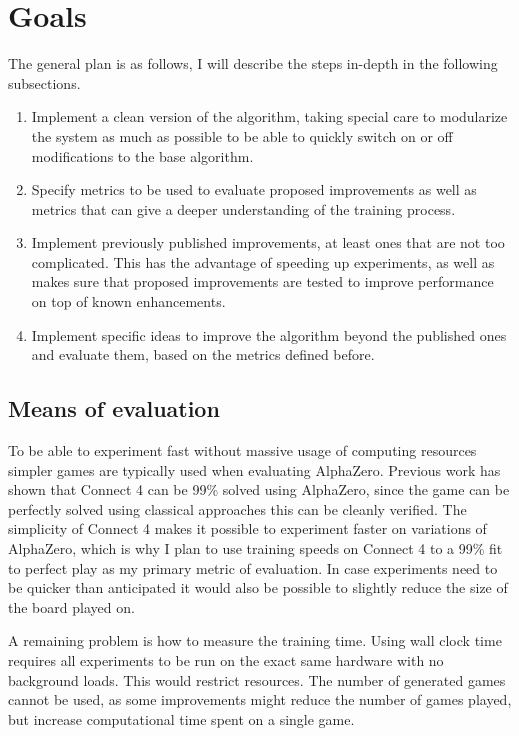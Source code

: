 \documentclass[12pt,onecolumn,oneside,titlepage]{article}
\begin{document}
\section{Goals}

The general plan is as follows, I will describe the steps in-depth in the following subsections.

\begin{enumerate}
 \item Implement a clean version of the algorithm, taking special care to modularize the system as much as possible to be able to quickly switch on or off modifications to the base algorithm.
 \item Specify metrics to be used to evaluate proposed improvements as well as metrics that can give a deeper understanding of the training process.
 \item Implement previously published improvements, at least ones that are not too complicated. This has the advantage of speeding up experiments, as well as makes sure that proposed improvements are tested to improve performance on top of known enhancements.
 \item Implement specific ideas to improve the algorithm beyond the published ones and evaluate them, based on the metrics defined before.
\end{enumerate}


\subsection{Means of evaluation}

To be able to experiment fast without massive usage of computing resources simpler games are typically used when evaluating AlphaZero.
Previous work \cite{oracledevs} has shown that Connect 4 can be 99\% solved using AlphaZero, since the game can be perfectly solved using classical approaches this can be cleanly verified.
The simplicity of Connect 4 makes it possible to experiment faster on variations of AlphaZero, which is why I plan to use training speeds on Connect 4 to a 99\% fit to perfect play as my primary metric of evaluation. In case
experiments need to be quicker than anticipated it would also be possible to slightly reduce the size of the board played on.

A remaining problem is how to measure the training time. Using wall clock time requires all experiments to be run on the exact same hardware with no background loads. This would restrict resources.
The number of generated games cannot be used, as some improvements might reduce the number of games played, but increase computational time spent on a single game.
\end{document}
